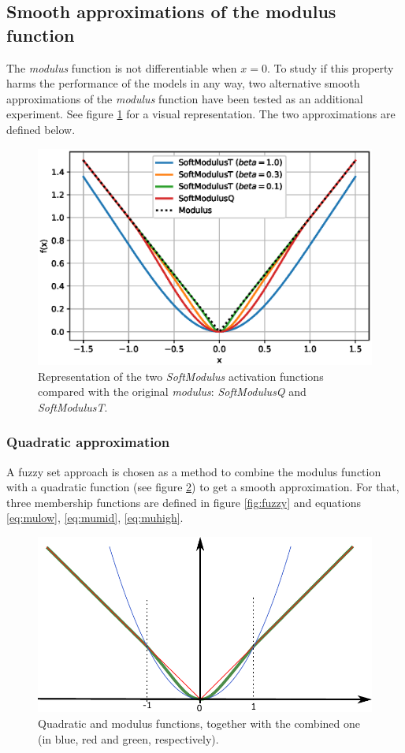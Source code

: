 \subsection{Smooth approximations of the modulus function}
The \textit{modulus} function is not differentiable when $x=0$. To study if this property harms the performance of the models in any way, two alternative smooth approximations of the \textit{modulus} function have been tested as an additional experiment. See figure \ref{fig:activationssmooth} for a visual representation. The two approximations are defined below.


\begin{figure}[h!]
	\centering
	\includegraphics[width=0.7\linewidth]{modulus/images/activations_smooth}
	\caption[Soft approximations to the \textit{modulus}]{Representation of the two \textit{SoftModulus} activation functions compared with the original \textit{modulus}: \textit{SoftModulusQ} and \textit{SoftModulusT}.}
	\label{fig:activationssmooth}
\end{figure}


\subsubsection{Quadratic approximation}
A fuzzy set approach is chosen as a method to combine the modulus function with a quadratic function (see figure \ref{fig:fuzzy_funcs}) to get a smooth approximation. For that, three membership functions are defined in figure \ref{fig:fuzzy} and equations \ref{eq:mulow}, \ref{eq:mumid}, \ref{eq:muhigh}.

\begin{figure}[h!]
	\centering
	\includegraphics[width=0.7\linewidth]{modulus/images/funcs_quad}
	\caption[Functions used for the quadratic approximation of the \textit{modulus}]{Quadratic and modulus functions, together with the combined one (in blue, red and green, respectively).}
	\label{fig:fuzzy_funcs}
\end{figure}

